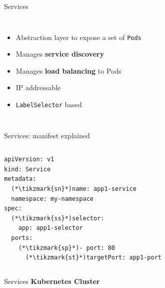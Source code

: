 \begin{frame}[fragile]{Services}
  \begin{columns}[c]
      \begin{itemize}
        \item Abstraction layer to expose a set of \texttt{Pods}
        \item Manages {\color{wsorange}\textbf{service discovery}}
        \item Manages {\color{wsorange}\textbf{load balancing}} to Pods
        \item IP addressable
        \item \texttt{LabelSelector} based
      \end{itemize}
  \end{columns}
\end{frame}

\begin{frame}[fragile]{Services: manifest explained}
  \begin{columns}[T]
      \begin{yamlbox}
\begin{lstlisting}[style=wsyamlstyle, basicstyle=\ttfamily\scriptsize]
apiVersion: v1
kind: Service
metadata:
  (*\tikzmark{sn}*)name: app1-service
  namespace: my-namespace
spec:
  (*\tikzmark{ss}*)selector:
    app: app1-selector
  ports:
    (*\tikzmark{sp}*)- port: 80
      (*\tikzmark{st}*)targetPort: app1-port
\end{lstlisting}
      \end{yamlbox}
  \end{columns}
\end{frame}

\begin{frame}{Services}
  \textbf{Kubernetes Cluster}
  \vfill\centering
  \vfill
\end{frame}

